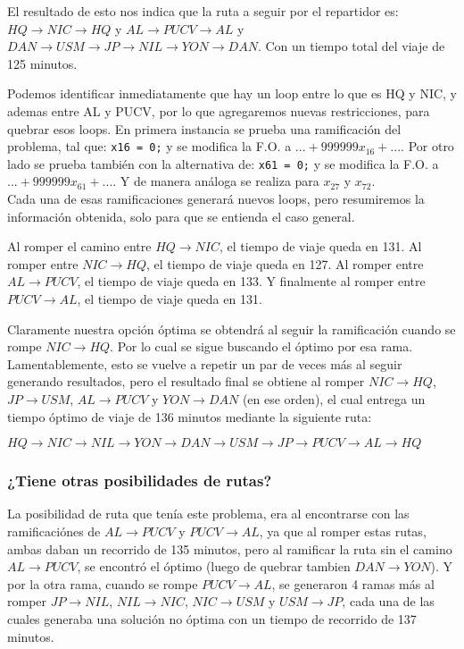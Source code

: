\documentclass[12pt,letterpaper]{article}
\begin{document}
El resultado de esto nos indica que la ruta a seguir por el repartidor es:
$HQ \to  NIC \to HQ$ y $AL \to PUCV \to AL$ y $DAN \to USM \to JP \to NIL \to YON \to DAN$. Con un tiempo total del viaje
de 125 minutos.

Podemos identificar inmediatamente que hay un loop entre lo que es HQ y NIC, y ademas entre AL y PUCV, por lo que agregaremos nuevas restricciones, para quebrar esos loops. En primera instancia se prueba una ramificación del problema, tal que: \verb+x16 = 0;+ y se modifica la F.O. a $... + 999999 x_{16} + ...$. Por otro lado se prueba también con la alternativa de: \verb+x61 = 0;+ y se modifica la F.O. a $... + 999999 x_{61} + ...$. Y de manera análoga se realiza para $x_{27}$ y $x_{72}$.
\\

Cada una de esas ramificaciones generará nuevos loops, pero resumiremos la información obtenida, solo para que se entienda el caso general.

Al romper el camino entre $HQ \to NIC$, el tiempo de viaje queda en 131. Al romper entre $NIC \to HQ$, el tiempo de viaje queda en 127. Al romper entre $AL \to PUCV$, el tiempo de viaje queda en 133. Y finalmente al romper entre $PUCV \to AL$, el tiempo de viaje queda en 131.

Claramente nuestra opción óptima se obtendrá al seguir la ramificación cuando se rompe $NIC \to HQ$. Por lo cual se sigue buscando el óptimo por esa rama.
Lamentablemente, esto se vuelve a repetir un par de veces más al seguir generando resultados, pero el resultado final se obtiene al romper $NIC \to HQ$, $JP \to USM$, $AL \to PUCV$ y $YON \to DAN$ (en ese orden), el cual entrega un tiempo óptimo de viaje de 136 minutos mediante la siguiente ruta:

\begin{center}$HQ \to NIC \to NIL \to YON \to DAN \to USM \to JP \to PUCV \to AL \to HQ$\end{center}

\subsubsection{¿Tiene otras posibilidades de rutas?}
La posibilidad de ruta que tenía este problema, era al encontrarse con las ramificaciónes de $AL \to PUCV$ y $PUCV \to AL$, ya que al romper estas rutas, ambas daban un recorrido de 135 minutos, pero al ramificar la ruta sin el camino $AL \to PUCV$, se encontró el óptimo (luego de quebrar tambien $DAN \to YON$). Y por la otra rama, cuando se rompe $PUCV \to AL$, se generaron 4 ramas más al romper $JP \to NIL$, $NIL \to NIC$, $NIC \to USM$ y $USM \to JP$, cada una de las cuales generaba una solución no óptima con un tiempo de recorrido de 137 minutos.
\end{document}
